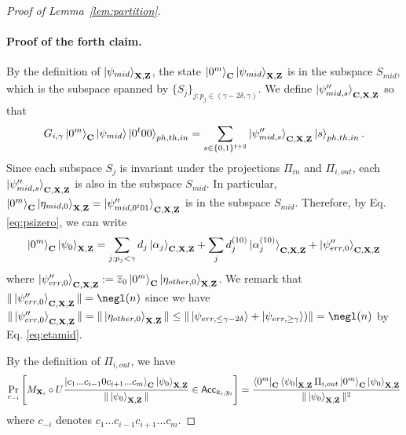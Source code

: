 \begin{proof}[Proof of Lemma~\ref{lem:partition}]
\paragraph{Proof of the forth claim.}
By the definition of $\ket{\psi_{mid}}_{\mathbf{X},\mathbf{Z}}$, the state $\ket{0^m}_{\mathbf{C}}\ket{\psi_{mid}}_{\mathbf{X},\mathbf{Z}}$ is in the subspace $S_{mid}$, which is the subspace spanned by $\{S_j\}_{j:p_j\in (\gamma-2\delta,\gamma)}$.
We define $\ket{\psi''_{mid,s}}_{\mathbf{C},\mathbf{X},\mathbf{Z}}$ so that 
\begin{align*}
G_{i,\gamma}\ket{0^m}_{\mathbf{C}}\ket{\psi_{mid}}\ket{0^t00}_{ph,th,in}=\sum_{s\in \{0,1\}^{t+2}} \ket{\psi''_{mid,s}}_{\mathbf{C},\mathbf{X},\mathbf{Z}}\ket{s}_{ph,th,in}.
\end{align*}
Since each subspace $S_j$ is invariant under the projections $\Pi_{in}$ and $\Pi_{i,out}$, each $\ket{\psi''_{mid,s}}_{\mathbf{C},\mathbf{X},\mathbf{Z}}$ is also in the subspace $S_{mid}$. 
In particular, $\ket{0^m}_{\mathbf{C}}\ket{\eta_{mid,0}}_{\mathbf{X},\mathbf{Z}}=\ket{\psi''_{mid,0^t01}}_{\mathbf{C},\mathbf{X},\mathbf{Z}}$ is in the subspace $S_{mid}$.
Therefore, by Eq. \ref{eq:psizero}, we can write 
\begin{align}
\ket{0^m}_{\mathbf{C}}\ket{\psi_0}_{\mathbf{X},\mathbf{Z}}=\sum_{j:p_j<\gamma} d_j \ket{\alpha_j}_{\mathbf{C},\mathbf{X},\mathbf{Z}}+\sum_{j} d_j^{(10)} \ket{\alpha_j^{(10)}}_{\mathbf{C},\mathbf{X},\mathbf{Z}}+\ket{\psi''_{err,0}}_{\mathbf{C},\mathbf{X},\mathbf{Z}}  \label{eq:psizero_decompose} 
\end{align}
where $\ket{\psi''_{err,0}}_{\mathbf{C},\mathbf{X},\mathbf{Z}}:=\overline{z}_0 \ket{0^m}_{\mathbf{C}}\ket{\eta_{other,0}}_{\mathbf{X},\mathbf{Z}}$.
We remark that $\|\ket{\psi''_{err,0}}_{\regC,\regX,\regZ}\|=\negl(\secpar)$ since we have $\|\ket{\psi''_{err,0}}_{\regC,\regX,\regZ}\|=\|\ket{\eta_{other,0}}_{\regX,\regZ}\|\leq \|\ket{\psi_{err,\leq \gamma-2\delta}}+\ket{\psi_{err,\geq \gamma}})\|=\negl(\secpar)$ by Eq. \ref{eq:etamid}.

By the definition of $\Pi_{i,out}$, we have 
\begin{align}
 \Pr_{c_{-i}}\left[M_{\mathbf{X}_i}\circ U\frac{\ket{c_1...c_{i-1}0c_{i+1}...c_m}_{\mathbf{C}}\ket{\psi_0}_{\mathbf{X},\mathbf{Z}}}{\|\ket{\psi_0}_{\mathbf{X},\mathbf{Z}}\|}\in \mathsf{Acc}_{k_i,y_i}\right]=\frac{\bra{0^m}_{\mathbf{C}}\bra{\psi_0}_{\mathbf{X},\mathbf{Z}} \Pi_{i,out} \ket{0^m}_{\mathbf{C}}\ket{\psi_0}_{\mathbf{X},\mathbf{Z}}}{\|\ket{\psi_0}_{\mathbf{X},\mathbf{Z}}\|^2} \label{eq:accept_probability}
\end{align}
where $c_{-i}$ denotes $c_1...c_{i-1}c_{i+1}...c_{m}$.


\end{proof}
